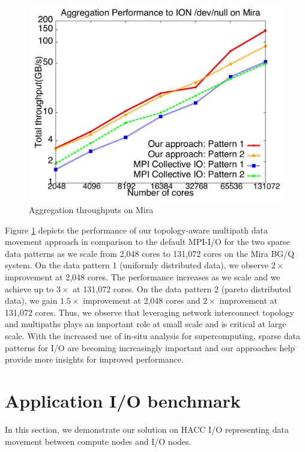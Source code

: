 \documentclass[final,5p,times]{elsarticle}
\begin{document}
\begin{figure}[!htb]
\vspace{-0.1in}
\centering
\includegraphics[scale=0.3]{figures/mira_agg.pdf}
\vspace{-0.2in}
\caption{Aggregation throughputs on Mira}
\vspace{-0.2in}
\label{fig:mira_agg}
\end{figure}

Figure \ref{fig:mira_agg} depicts the performance of our topology-aware multipath data movement approach in comparison to the default MPI-I/O for the two sparse data patterns as we scale from 2,048 cores to 131,072 cores on the Mira BG/Q system. On the data pattern 1 (uniformly distributed data), we observe  $2\times$ improvement at 2,048 cores. The performance increases as we scale and we achieve up to $3\times$ at 131,072 cores. On the data pattern 2 (pareto distributed data), we gain $1.5\times$ improvement at 2,048 cores and $2\times$ improvement at 131,072 cores. Thus, we observe that leveraging network interconnect topology and multipaths plays an important role at small scale and is critical at large scale. With the increased use of in-situ analysis for supercomputing,  sparse data patterns for I/O are becoming increasingly important and our approaches help provide more insights for improved performance.

\section{Application I/O benchmark}
\label{sec:app_benchmarks}
In this section, we demonstrate our solution on HACC I/O representing data movement between compute nodes and I/O nodes.
\end{document}
